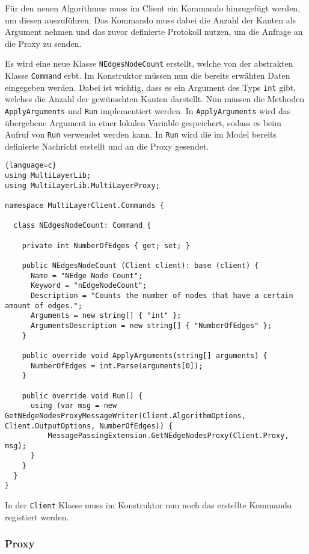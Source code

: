 Für den neuen Algorithmus muss im Client ein Kommando hinzugefügt werden, um diesen auszuführen. Das Kommando muss dabei die Anzahl der Kanten als Argument nehmen und das zuvor definierte Protokoll nutzen, um die Anfrage an die Proxy zu senden.

Es wird eine neue Klasse \verb|NEdgesNodeCount| erstellt, welche von der abstrakten Klasse \verb|Command| erbt. Im Konstruktor müssen nun die bereits erwähten Daten eingegeben werden. Dabei ist wichtig, dass es ein Argument des Typs \verb|int| gibt, welches die Anzahl der gewünschten Kanten darstellt.
Nun müssen die Methoden \verb|ApplyArguments| und \verb|Run| implementiert werden.
In \verb|ApplyArguments| wird das übergebene Argument in einer lokalen Variable gespeichert, sodass es beim Aufruf von \verb|Run| verwendet werden kann.
In \verb|Run| wird die im Model bereits definierte Nachricht erstellt und an die Proxy gesendet.

\begin{lstlisting}{language=c}
using MultiLayerLib;
using MultiLayerLib.MultiLayerProxy;

namespace MultiLayerClient.Commands {

  class NEdgesNodeCount: Command {

    private int NumberOfEdges { get; set; }

    public NEdgesNodeCount (Client client): base (client) {
      Name = "NEdge Node Count";
      Keyword = "nEdgeNodeCount";
      Description = "Counts the number of nodes that have a certain amount of edges.";
      Arguments = new string[] { "int" };
      ArgumentsDescription = new string[] { "NumberOfEdges" };
    }

    public override void ApplyArguments(string[] arguments) {
      NumberOfEdges = int.Parse(arguments[0]);
    }

    public override void Run() {
      using (var msg = new GetNEdgeNodesProxyMessageWriter(Client.AlgorithmOptions, Client.OutputOptions, NumberOfEdges)) {
          MessagePassingExtension.GetNEdgeNodesProxy(Client.Proxy, msg);
      }      
    }
  }
}
\end{lstlisting}


In der \verb|Client| Klasse muss im Konstruktor nun noch das erstellte Kommando registiert werden.

\subsubsection{Proxy}

